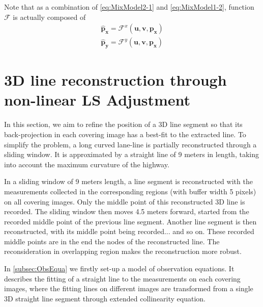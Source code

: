 Note that as a combination of \eqref{eq:MixModel2-1} and \eqref{eq:MixModel1-2}, function $\mathcal{F}$ is actually composed of
\begin{equation} \label{eq:Ffunction_xy}
\begin{split}
\mathbf{\hat{p}_x} = \mathcal{F}^x(\mathbf{u},\mathbf{v},\mathbf{p_x})\\
\mathbf{\hat{p}_y} = \mathcal{F}^y(\mathbf{u},\mathbf{v},\mathbf{p_x})
\end{split}
\end{equation}


\clearpage
\section{3D line reconstruction through non-linear LS Adjustment}
\label{sec:LSadj}

In this section, we aim to refine the position of a 3D line segment so that its back-projection in each covering image has a best-fit to the extracted line. To simplify the problem, a long curved lane-line is partially reconstructed through a sliding window. It is approximated by a straight line of 9 meters in length, taking into account the maximum curvature of the highway.

In a sliding window of 9 meters length, a line segment is reconstructed with the measurements collected in the corresponding regions (with buffer width 5 pixels) on all covering images. Only the middle point of this reconstructed 3D line is recorded. The sliding window then moves 4.5 meters forward, started from the recorded middle point of the previous line segment. Another line segment is then reconstructed, with its middle point being recorded... and so on. These recorded middle points are in the end the nodes of the reconstructed line. The reconsideration in overlapping region makes the reconstruction more robust.

In \cref{subsec:ObsEqua} we firstly set-up a model of observation equations. It describes the fitting of a straight line to the measurements on each covering images, where the fitting lines on different images are transformed from a single 3D straight line segment through extended collinearity equation.

